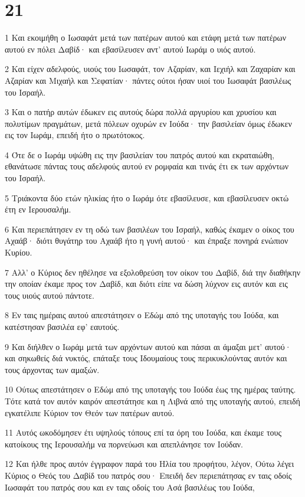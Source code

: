 \chapter{21}

\par 1 Και εκοιμήθη ο Ιωσαφάτ μετά των πατέρων αυτού και ετάφη μετά των πατέρων αυτού εν πόλει Δαβίδ· και εβασίλευσεν αντ' αυτού Ιωράμ ο υιός αυτού.
\par 2 Και είχεν αδελφούς, υιούς του Ιωσαφάτ, τον Αζαρίαν, και Ιεχιήλ και Ζαχαρίαν και Αζαρίαν και Μιχαήλ και Σεφατίαν· πάντες ούτοι ήσαν υιοί του Ιωσαφάτ βασιλέως του Ισραήλ.
\par 3 Και ο πατήρ αυτών έδωκεν εις αυτούς δώρα πολλά αργυρίου και χρυσίου και πολυτίμων πραγμάτων, μετά πόλεων οχυρών εν Ιούδα· την βασιλείαν όμως έδωκεν εις τον Ιωράμ, επειδή ήτο ο πρωτότοκος.
\par 4 Ότε δε ο Ιωράμ υψώθη εις την βασιλείαν του πατρός αυτού και εκραταιώθη, εθανάτωσε πάντας τους αδελφούς αυτού εν ρομφαία και τινάς έτι εκ των αρχόντων του Ισραήλ.
\par 5 Τριάκοντα δύο ετών ηλικίας ήτο ο Ιωράμ ότε εβασίλευσε, και εβασίλευσεν οκτώ έτη εν Ιερουσαλήμ.
\par 6 Και περιεπάτησεν εν τη οδώ των βασιλέων του Ισραήλ, καθώς έκαμεν ο οίκος του Αχαάβ· διότι θυγάτηρ του Αχαάβ ήτο η γυνή αυτού· και έπραξε πονηρά ενώπιον Κυρίου.
\par 7 Αλλ' ο Κύριος δεν ηθέλησε να εξολοθρεύση τον οίκον του Δαβίδ, διά την διαθήκην την οποίαν έκαμε προς τον Δαβίδ, και διότι είπε να δώση λύχνον εις αυτόν και εις τους υιούς αυτού πάντοτε.
\par 8 Εν ταις ημέραις αυτού απεστάτησεν ο Εδώμ από της υποταγής του Ιούδα, και κατέστησαν βασιλέα εφ' εαυτούς.
\par 9 Και διήλθεν ο Ιωράμ μετά των αρχόντων αυτού και πάσαι αι άμαξαι μετ' αυτού· και σηκωθείς διά νυκτός, επάταξε τους Ιδουμαίους τους περικυκλούντας αυτόν και τους άρχοντας των αμαξών.
\par 10 Ούτως απεστάτησεν ο Εδώμ από της υποταγής του Ιούδα έως της ημέρας ταύτης. Τότε κατά τον αυτόν καιρόν απεστάτησε και η Λιβνά από της υποταγής αυτού, επειδή εγκατέλιπε Κύριον τον Θεόν των πατέρων αυτού.
\par 11 Αυτός ωκοδόμησεν έτι υψηλούς τόπους επί τα όρη του Ιούδα, και έκαμε τους κατοίκους της Ιερουσαλήμ να πορνεύωσι και απεπλάνησε τον Ιούδαν.
\par 12 Και ήλθε προς αυτόν έγγραφον παρά του Ηλία του προφήτου, λέγον, Ούτω λέγει Κύριος ο Θεός του Δαβίδ του πατρός σου· Επειδή δεν περιεπάτησας εν ταις οδοίς Ιωσαφάτ του πατρός σου και εν ταις οδοίς του Ασά βασιλέως του Ιούδα,

